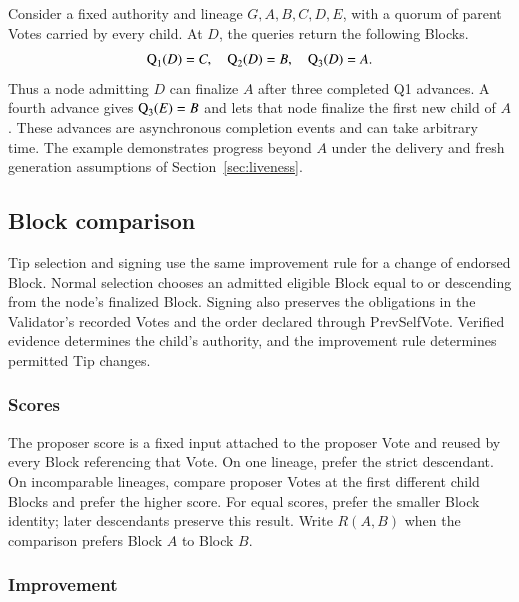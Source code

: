 Consider a fixed authority and lineage $G,A,B,C,D,E$, with a quorum of parent Votes carried by every child.
At $D$, the queries return the following Blocks.
\[
\operatorname{Q}_{1}(D)=C,\quad \operatorname{Q}_{2}(D)=B,\quad \operatorname{Q}_{3}(D)=A.
\]
Thus a node admitting $D$ can finalize $A$ after three completed Q1 advances.
A fourth advance gives $\operatorname{Q}_{3}(E)=B$ and lets that node finalize the first new child of $A$.
These advances are asynchronous completion events and can take arbitrary time.
The example demonstrates progress beyond $A$ under the delivery and fresh generation assumptions of Section~\ref{sec:liveness}.

\subsection{Block comparison}\label{sec:permission}

Tip selection and signing use the same improvement rule for a change of endorsed Block.
Normal selection chooses an admitted eligible Block equal to or descending from the node's finalized Block.
Signing also preserves the obligations in the Validator's recorded Votes and the order declared through PrevSelfVote.
Verified evidence determines the child's authority, and the improvement rule determines permitted Tip changes.

\subsubsection{Scores}\label{sec:ordering}

The proposer score is a fixed input attached to the proposer Vote and reused by every Block referencing that Vote.
On one lineage, prefer the strict descendant.
On incomparable lineages, compare proposer Votes at the first different child Blocks and prefer the higher score.
For equal scores, prefer the smaller Block identity; later descendants preserve this result.
Write $R(A,B)$ when the comparison prefers Block $A$ to Block $B$.

\subsubsection{Improvement}

